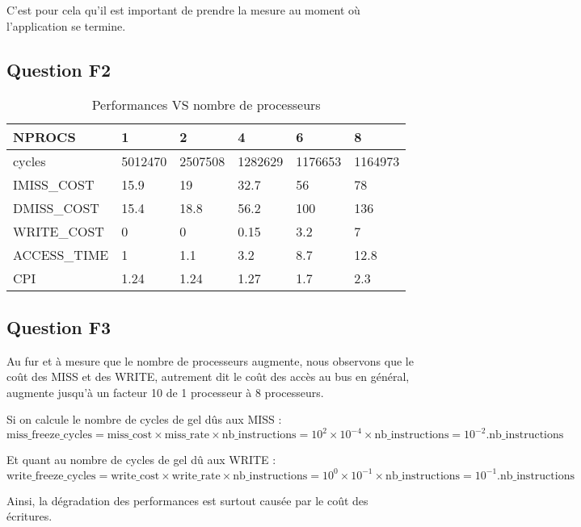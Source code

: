 \documentclass{article}
\begin{document}
C'est pour cela qu'il est important de prendre la mesure au moment où l'application se termine.

\subsection{Question F2}

\begin{table}[H]
\centering
\begingroup
\setlength{\tabcolsep}{5pt}
\renewcommand{\arraystretch}{1.1}
\begin{tabular}{| l | l | l | l | l | l |}

\hline
NPROCS	& 1		& 2     	& 4     	& 6     	& 8     	\\
\hline
\hline
cycles	& 5012470	& 2507508	& 1282629	& 1176653	& 1164973	\\
\hline
IMISS\_COST & 15.9	& 19		& 32.7		& 56		& 78		\\
\hline
DMISS\_COST & 15.4	& 18.8		& 56.2		& 100		& 136		\\
\hline
WRITE\_COST & 0		& 0		& 0.15		& 3.2		& 7		\\ 
\hline
ACCESS\_TIME & 1	& 1.1		& 3.2		& 8.7		& 12.8		\\
\hline
CPI	& 1.24		& 1.24		& 1.27		& 1.7		& 2.3		\\
\hline

\end{tabular}
\caption{Performances VS nombre de processeurs}
\endgroup
\end{table}

\subsection{Question F3}

Au fur et à mesure que le nombre de processeurs augmente, nous observons que le coût des MISS
et des WRITE, autrement dit le coût des accès au bus en général, augmente jusqu'à un facteur 10
de 1 processeur à 8 processeurs.

Si on calcule le nombre de cycles de gel dûs aux MISS :
\[ \text{miss\_freeze\_cycles} = \text{miss\_cost} \times \text{miss\_rate} \times \text{nb\_instructions}
= 10^2 \times 10^{-4} \times \text{nb\_instructions} = 10^{-2}. \text{nb\_instructions} \]

Et quant au nombre de cycles de gel dû aux WRITE :
\[ \text{write\_freeze\_cycles} = \text{write\_cost} \times \text{write\_rate} \times \text{nb\_instructions}
= 10^0 \times 10^{-1} \times \text{nb\_instructions} = 10^{-1}. \text{nb\_instructions} \]

Ainsi, la dégradation des performances est surtout causée par le coût des écritures.

\end{document}
